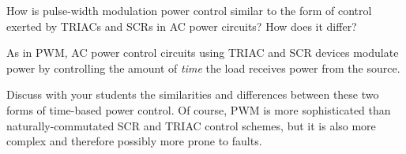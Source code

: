 

How is pulse-width modulation power control similar to the form of control exerted by TRIACs and SCRs in AC power circuits?  How does it differ?







As in PWM, AC power control circuits using TRIAC and SCR devices modulate power by controlling the amount of {\it time} the load receives power from the source.







Discuss with your students the similarities and differences between these two forms of time-based power control.  Of course, PWM is more sophisticated than naturally-commutated SCR and TRIAC control schemes, but it is also more complex and therefore possibly more prone to faults.




